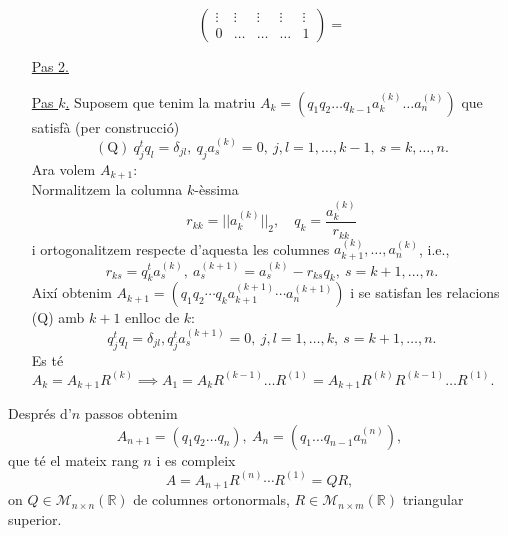 \documentclass[11pt]{book}
\newcommand{\field}[1]{\mathbb{#1}}
\newcommand{\norm}[1]{||#1||}
\newcommand{\matr}[2]{\mathcal{M}_{#1\times#2}(\field{R})}
\begin{document}
\begin{enumerate}
\[\begin{pmatrix}
    \vdots & \vdots & \vdots & \vdots & \vdots\\
    0 & \ldots & \ldots & \ldots & 1
    \end{pmatrix}=
    \]
    \item[\underline{Pas 2.}] 
    \item[\underline{Pas $k$.}] Suposem que tenim la matriu $A_k=(q_1q_2\ldots q_{k-1}a_k^{(k)}\ldots a_n^{(k)})$ que satisfà (per construcció)
    \[
    (\textrm{Q})\ q_j^tq_l=\delta_{jl},\ q_ja_s^{(k)}=0,\ j,l=1,\ldots,k-1,\ s=k,\ldots,n.
    \]
    Ara volem $A_{k+1}$:\\
    Normalitzem la columna $k$-èssima
    \[
    r_{kk}=\norm{a_k^{(k)}}_2,\quad q_k=\dfrac{a_k^{(k)}}{r_{kk}}
    \]
    i ortogonalitzem respecte d'aquesta les columnes $a_{k+1}^{(k)},\ldots,a_n^{(k)}$, i.e.,
    \[
    r_{ks}=q_k^ta_s^{(k)},\ a_s^{(k+1)}=a_s^{(k)}-r_{ks}q_k,\ s=k+1,\ldots,n.
    \]
    Així obtenim $A_{k+1}=(q_1q_2\cdots q_k a_{k+1}^{(k+1)}\cdots a_n^{(k+1)})$ i se satisfan les relacions (Q) amb $k+1$ enlloc de $k$:
    \[
    q_j^tq_l=\delta_{jl},q_j^ta_s^{(k+1)}=0,\ j,l=1,\ldots,k,\ s=k+1,\ldots, n.
    \]
    Es té $A_k=A_{k+1}R^{(k)}\implies A_1=A_kR^{(k-1)}\ldots R^{(1)}=A_{k+1}R^{(k)}R^{(k-1)}\ldots R^{(1)}.$
\end{enumerate}
Després d'$n$ passos obtenim
\[
A_{n+1}=(q_1q_2\ldots q_n),\ A_n=(q_1\ldots q_{n-1}a_n^{(n)}),
\]
que té el mateix rang $n$ i es compleix
\[
A=A_{n+1}R^{(n)}\cdots R^{(1)}=QR,
\]
on $Q\in\matr{n}{n}$ de columnes ortonormals, $R\in\matr{n}{m}$ triangular superior.
\newpage
\end{document}
